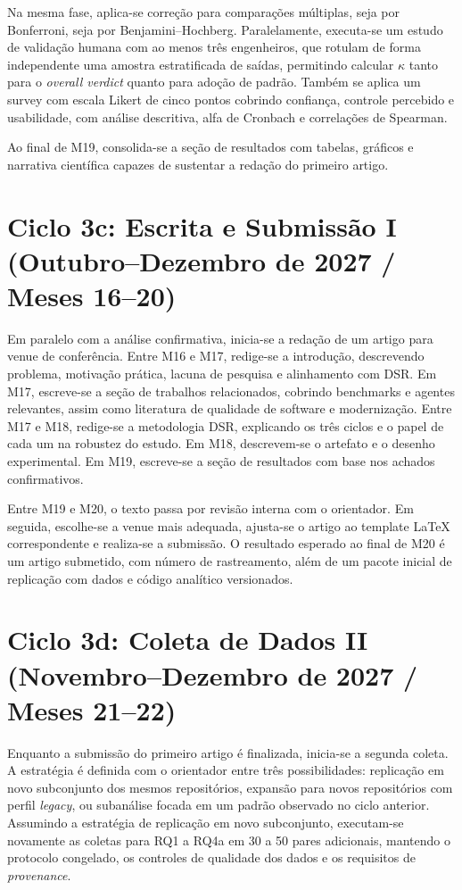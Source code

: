 \documentclass[12pt,a4paper]{article}
\begin{document}
Na mesma fase, aplica-se correção para comparações múltiplas, seja por Bonferroni, seja por Benjamini--Hochberg. Paralelamente, executa-se um estudo de validação humana com ao menos três engenheiros, que rotulam de forma independente uma amostra estratificada de saídas, permitindo calcular $\kappa$ tanto para o \textit{overall verdict} quanto para adoção de padrão. Também se aplica um survey com escala Likert de cinco pontos cobrindo confiança, controle percebido e usabilidade, com análise descritiva, alfa de Cronbach e correlações de Spearman.

Ao final de M19, consolida-se a seção de resultados com tabelas, gráficos e narrativa científica capazes de sustentar a redação do primeiro artigo.

\section*{Ciclo 3c: Escrita e Submissão I (Outubro--Dezembro de 2027 / Meses 16--20)}

Em paralelo com a análise confirmativa, inicia-se a redação de um artigo para venue de conferência. Entre M16 e M17, redige-se a introdução, descrevendo problema, motivação prática, lacuna de pesquisa e alinhamento com DSR. Em M17, escreve-se a seção de trabalhos relacionados, cobrindo benchmarks e agentes relevantes, assim como literatura de qualidade de software e modernização. Entre M17 e M18, redige-se a metodologia DSR, explicando os três ciclos e o papel de cada um na robustez do estudo. Em M18, descrevem-se o artefato e o desenho experimental. Em M19, escreve-se a seção de resultados com base nos achados confirmativos.

Entre M19 e M20, o texto passa por revisão interna com o orientador. Em seguida, escolhe-se a venue mais adequada, ajusta-se o artigo ao template LaTeX correspondente e realiza-se a submissão. O resultado esperado ao final de M20 é um artigo submetido, com número de rastreamento, além de um pacote inicial de replicação com dados e código analítico versionados.

\section*{Ciclo 3d: Coleta de Dados II (Novembro--Dezembro de 2027 / Meses 21--22)}

Enquanto a submissão do primeiro artigo é finalizada, inicia-se a segunda coleta. A estratégia é definida com o orientador entre três possibilidades: replicação em novo subconjunto dos mesmos repositórios, expansão para novos repositórios com perfil \textit{legacy}, ou subanálise focada em um padrão observado no ciclo anterior. Assumindo a estratégia de replicação em novo subconjunto, executam-se novamente as coletas para RQ1 a RQ4a em 30 a 50 pares adicionais, mantendo o protocolo congelado, os controles de qualidade dos dados e os requisitos de \textit{provenance}.
\end{document}
